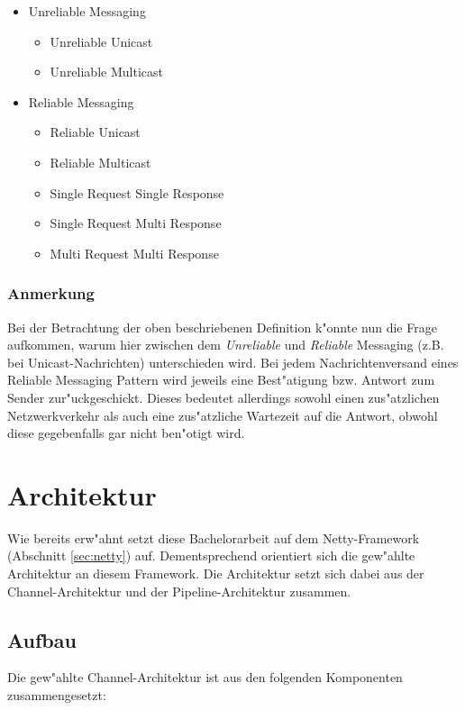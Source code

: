 \begin{itemize}
\item Unreliable Messaging
\begin{itemize}
\item Unreliable Unicast
\item Unreliable Multicast
\end{itemize}
\item Reliable Messaging
\begin{itemize}
\item Reliable Unicast
\item Reliable Multicast
\item Single Request Single Response
\item Single Request Multi Response
\item Multi Request Multi Response
\end{itemize}
\end{itemize}

\subsubsection{Anmerkung}
Bei der Betrachtung der oben beschriebenen Definition k"onnte nun die Frage aufkommen, warum hier zwischen dem {\it Unreliable} und {\it Reliable} Messaging (z.B. bei Unicast-Nachrichten) unterschieden wird. Bei jedem Nachrichtenversand eines Reliable Messaging Pattern wird jeweils eine Best"atigung bzw. Antwort zum Sender zur"uckgeschickt. Dieses bedeutet allerdings sowohl einen zus"atzlichen Netzwerkverkehr als auch eine zus"atzliche Wartezeit auf die Antwort, obwohl diese gegebenfalls gar nicht ben"otigt wird.

\section{Architektur}
\label{sec:architektur}
Wie bereits erw"ahnt setzt diese Bachelorarbeit auf dem Netty-Framework (Abschnitt \ref{sec:netty}) auf. Dementsprechend orientiert sich die gew"ahlte Architektur an diesem Framework. Die Architektur setzt sich dabei aus der Channel-Architektur und der Pipeline-Architektur zusammen.

\subsection{Aufbau}
\label{subsec:mep-arch-channel}

Die gew"ahlte Channel-Architektur ist aus den folgenden Komponenten zusammengesetzt:

